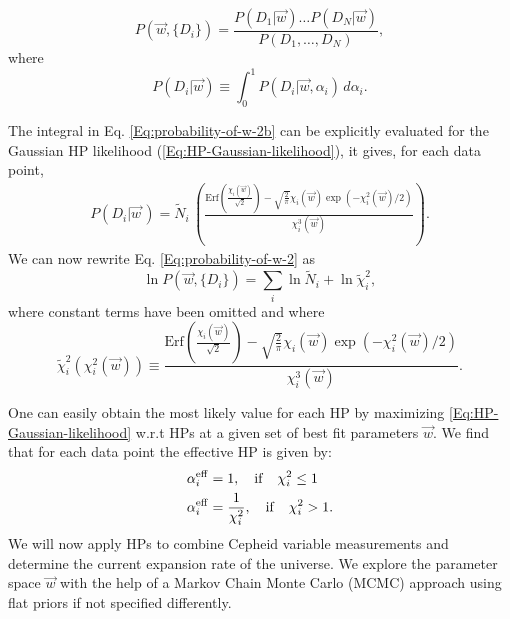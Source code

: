 \begin{equation}\label{Eq:probability-of-w-2}
P(\vec{w},\lbrace D_i \rbrace) = \frac{P(D_1|\vec{w})\dots P(D_N|\vec{w})}{P(D_1,\dots,D_N)},
\end{equation}
where 
\begin{equation}\label{Eq:probability-of-w-2b}
P(D_i|\vec{w}) \equiv \int_0^1 P(D_i|\vec{w},\alpha_i)\, d\alpha_i.
\end{equation}

The integral in Eq. \eqref{Eq:probability-of-w-2b} can be explicitly evaluated for the Gaussian HP likelihood (\ref{Eq:HP-Gaussian-likelihood}), it gives, for each data point,
\begin{eqnarray}\label{Eq:hyper-likelihood}
P(D_i|\vec{w}\,) = \tilde{N}_i \, \left(\frac{ \mathrm{Erf}\left( \frac{\chi_i(\vec{w})}{\sqrt{2}} \right)  -\sqrt{\frac{2}\pi} \chi_i(\vec{w}) \exp(-\chi^2_i(\vec{w})/2)}{ \chi^3_i(\vec{w})} \right).
\end{eqnarray}
We can now rewrite Eq. \eqref{Eq:probability-of-w-2} as
\begin{equation}\label{Eq:probability-of-w-2c}
\ln P(\vec{w},\lbrace D_i \rbrace) = \sum_i \ln \tilde{N}_i + \ln \tilde{\chi}^2_i, 
\end{equation} 
where constant terms have been omitted and where
\begin{equation}\label{Eq:hyper-chi2}
\tilde{\chi}^2_i(\chi^2_i(\vec{w})) \equiv \frac{ \mathrm{Erf}\left( \frac{\chi_i(\vec{w})}{\sqrt{2}} \right)  -\sqrt{\frac{2}\pi} \chi_i(\vec{w}) \exp(-\chi^2_i(\vec{w})/2)}{ \chi^3_i(\vec{w})}.
\end{equation}

One can easily obtain the most likely value for each HP by maximizing \eqref{Eq:HP-Gaussian-likelihood} w.r.t HPs at a given set of best fit parameters $\vec{w}$. We find that for each data point the effective HP is given by:
\begin{subequations}\label{Eq:effective-HPs}
\begin{align}
\label{Eq:effective-HP-1}
\alpha^{\mathrm{eff}}_i & = 1,\quad \mathrm{if} \quad \chi^2_i\leq1
\\
\label{Eq:effective-HP-2}
\alpha^{\mathrm{eff}}_i & = \frac{1}{\chi^2_i},\quad \mathrm{if} \quad \chi^2_i> 1.
\end{align}
\end{subequations}
We will now apply HPs to combine Cepheid variable measurements and determine the current expansion rate of the universe. We explore the parameter space $\vec{w}$ with the help of a Markov Chain Monte Carlo (MCMC) approach using flat priors if not specified differently.

